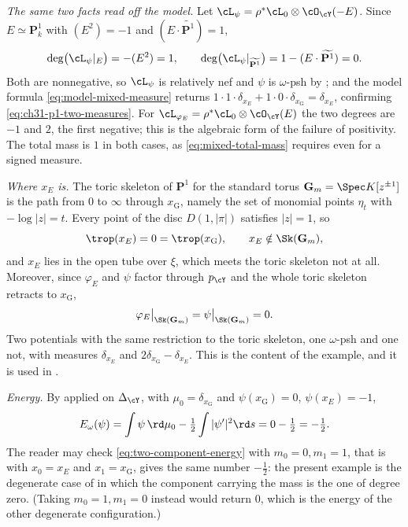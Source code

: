 \begin{example}
\emph{The same two facts read off the model.}  Let
$\cL_\psi=\rho^*\cL_0\otimes\cO_{\cY}(-E)$.  Since $E\simeq\mathbf P^1_k$
with $(E^2)=-1$ and $(E\cdot\widetilde{\mathbf P^1})=1$,
\[
 \deg\bigl(\cL_\psi|_E\bigr)=-(E^2)=1,
 \qquad
 \deg\bigl(\cL_\psi|_{\widetilde{\mathbf P^1}}\bigr)
  =1-(E\cdot\widetilde{\mathbf P^1})=0 .
\]
Both are nonnegative, so $\cL_\psi$ is relatively nef and $\psi$ is
$\omega$-psh by ; and the model formula
\eqref{eq:model-mixed-measure} returns
$1\cdot1\cdot\delta_{x_E}+1\cdot0\cdot\delta_{x_{\mathrm G}}=\delta_{x_E}$,
confirming \eqref{eq:ch31-p1-two-measures}.  For $\cL_{\varphi_E}
=\rho^*\cL_0\otimes\cO_{\cY}(E)$ the two degrees are $-1$ and $2$, the
first negative; this is the algebraic form of the failure of positivity.
The total mass is $1$ in both cases, as \eqref{eq:mixed-total-mass}
requires even for a signed measure.

\emph{Where $x_E$ is.}  The toric skeleton of $\mathbf P^1$ for the
standard torus $\mathbf G_m=\Spec K[z^{\pm1}]$ is the path from $0$ to
$\infty$ through $x_{\mathrm G}$, namely the set of monomial points
$\eta_t$ with $-\log|z|=t$.  Every point of the disc $D(1,|\pi|)$
satisfies $|z|=1$, so
\begin{equation}
\label{eq:ch31-p1-trop-collapse}
 \trop(x_E)=0=\trop(x_{\mathrm G}),
 \qquad x_E\notin\Sk(\mathbf G_m),
\end{equation}
and $x_E$ lies in the open tube over $\xi$, which meets the toric
skeleton not at all.  Moreover, since $\varphi_E$ and $\psi$ factor
through $p_{\cY}$ and the whole toric skeleton retracts to
$x_{\mathrm G}$,
\begin{equation}
\label{eq:ch31-p1-restrictions-agree}
 \varphi_E\big|_{\Sk(\mathbf G_m)}
 =\psi\big|_{\Sk(\mathbf G_m)}=0 .
\end{equation}
Two potentials with the same restriction to the toric skeleton, one
$\omega$-psh and one not, with measures $\delta_{x_E}$ and
$2\delta_{x_{\mathrm G}}-\delta_{x_E}$.  This is the content of the
example, and it is used in .

\emph{Energy.}  By  applied on
$\Delta_{\cY}$, with $\mu_0=\delta_{x_{\mathrm G}}$ and
$\psi(x_{\mathrm G})=0$, $\psi(x_E)=-1$,
\[
 E_\omega(\psi)=\int\psi\,\rd\mu_0-\tfrac12\int|\psi'|^2\rd s
 =0-\tfrac12=-\tfrac12 .
\]
The reader may check \eqref{eq:two-component-energy} with
$m_0=0,m_1=1$, that is with $x_0=x_E$ and $x_1=x_{\mathrm G}$, gives
the same number $-\tfrac12$: the present example is the degenerate case of
 in which the component carrying the mass is
the one of degree zero.  (Taking $m_0=1,m_1=0$ instead would return $0$,
which is the energy of the other degenerate configuration.)
\end{example}

